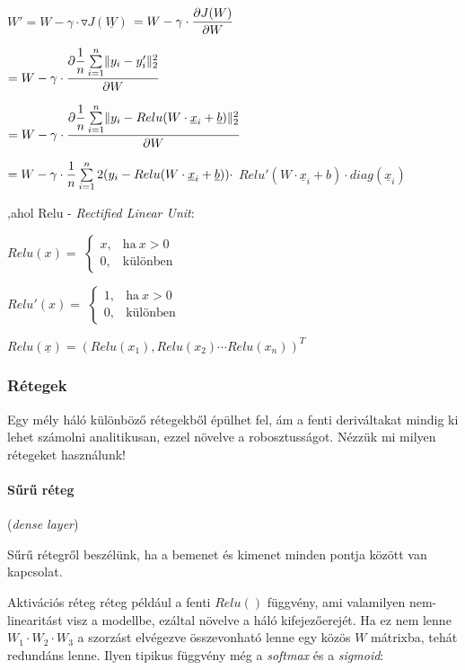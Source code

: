 $ W' = W - \gamma \cdot  \triangledown  J(\underline{W})$
$ = W - \gamma \cdot \dfrac{\partial {J(W)}}{\partial {W}} $

$ = W - \gamma \cdot  \dfrac{\partial { \dfrac{1}{n} \sum\limits_{{i}=1}^{n} \lVert y_i-y_i'\rVert_2^2}}{\partial {W}} $


$ = W - \gamma \cdot \dfrac{\partial { \dfrac{1}{n} \sum\limits_{{i}=1}^{n} \lVert y_i-Relu(W \cdot \underline{x}_i + \underline{b})\rVert_2^2}}{\partial {W}} $

$ = W - \gamma \cdot \dfrac{1}{n} \sum\limits_{{i}=1}^{n} 2 (y_i-Relu(W \cdot \underline{x}_i + \underline{b})) \cdot   $
$ Relu'(W \cdot \underline{x}_i + b) \cdot  diag(\underline{x}_i) $


\noindent
,ahol Relu - \textit{Rectified Linear Unit}:


$ Relu(x) =  $
$ \begin{cases}
x, & \text{ha}\ x > 0 \\
0, & \text{különben}
\end{cases} $

$ Relu'(x) =  $
$ \begin{cases}
1, & \text{ha}\ x > 0 \\
0, & \text{különben}
\end{cases} $

$ Relu(\underline{x}) = (Relu(x_1), Relu(x_2) \cdots Relu(x_n))^T $



\subsubsection{Rétegek}


Egy mély háló különböző rétegekből épülhet fel, ám a fenti deriváltakat
mindig ki lehet számolni analitikusan, ezzel növelve a robosztusságot.
Nézzük mi milyen rétegeket használunk!

\paragraph{Sűrű réteg} (\textit{dense layer}) 


Sűrű rétegről beszélünk, ha a bemenet és kimenet 
minden pontja között van kapcsolat.



Aktivációs réteg réteg például a fenti $ Relu() $ függvény, ami 
valamilyen nem-linearitást visz a modellbe, ezáltal növelve a háló 
kifejezőerejét. Ha ez nem lenne $ W_1 \cdot W_2 \cdot W_3 $ a szorzást 
elvégezve összevonható lenne egy közös $ W $ mátrixba, tehát redundáns 
lenne. Ilyen tipikus függvény még a \textit{softmax} és a \textit{sigmoid}:

